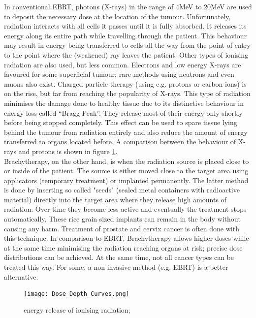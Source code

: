 In conventional EBRT, photons (X-rays) in the range of 4MeV to 20MeV are used to deposit the necessary dose at the location of the tumour.
Unfortunately, radiation interacts with all cells it passes until it is fully absorbed.
It releases its energy along its entire path while travelling through the patient.
This behaviour may result in energy being transferred to cells all the way from the point of entry to the point where the (weakened) ray leaves the patient.
Other types of ionising radiation are also used, but less common.
Electrons and low energy X-rays are favoured for some superficial tumour; rare methods using neutrons and even muons also exist.
Charged particle therapy (using e.g. protons or carbon ions) is on the rise, but far from reaching the popularity of X-rays.
This type of radiation minimises the damage done to healthy tissue due to its distinctive behaviour in energy loss called ``Bragg Peak''.
They release most of their energy only shortly before being stopped completely.
\cite{Nakamura2010} This effect can be used to spare tissue lying behind the tumour from radiation entirely and also reduce the amount of energy transferred to organs located before. \cite{Paganetti2005}
A comparison between the behaviour of X-rays and protons is shown in figure \ref{fig:bragg}.\\

Brachytherapy, on the other hand, is when the radiation source is placed close to or inside of the patient.
The source is either moved close to the target area using applicators (temporary treatment) or implanted permanently.
The latter method is done by inserting so called "seeds" (sealed metal containers with radioactive material) directly into the target area where they release high amounts of radiation.
Over time they become less active and eventually the treatment stops automatically.
These rice grain sized implants can remain in the body without causing any harm.
Treatment of prostate and cervix cancer is often done with this technique.
In comparison to EBRT, Brachytherapy allows higher doses while at the same time minimising the radiation reaching organs at risk; precise dose distributions can be achieved.
At the same time, not all cancer types can be treated this way.
For some, a non-invasive method (e.g. EBRT) is a better alternative.\\


\begin{figure}[!h]
	\centering
	\texttt{[image: Dose\_Depth\_Curves.png]}
	\caption{energy release of ionising radiation; \cite{Cepheiden}}
	\label{fig:bragg}
\end{figure}

